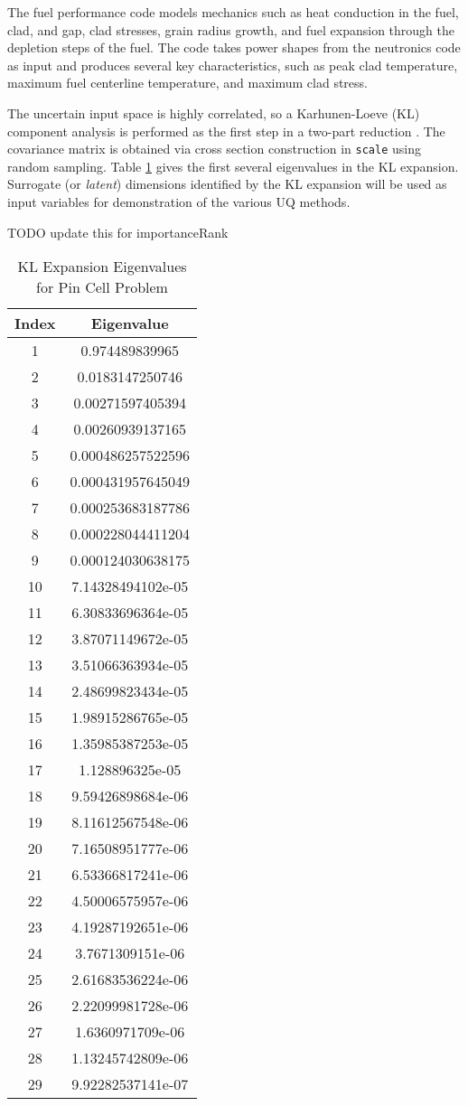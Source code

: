 The fuel performance code models mechanics such as heat conduction in the fuel, clad, and gap, clad stresses, grain radius
growth, and fuel expansion through the depletion steps of the fuel. The code takes power shapes
from the neutronics code as input and produces several key characteristics, such as peak clad temperature, maximum
fuel centerline temperature, and maximum clad stress.

The uncertain input space is highly correlated, so a Karhunen-Loeve (KL) component analysis is performed as
the first step in a two-part reduction \cite{physor2016}. The
covariance matrix is obtained via cross section construction in \texttt{scale}\cite{scale} using random sampling.  
Table \ref{tab:pcarank} gives the first several eigenvalues in the KL expansion.  Surrogate (or
\emph{latent}) dimensions identified by the KL expansion will be used as input variables for demonstration of
the various UQ methods.

TODO update this for importanceRank

\begin{table}[H]
  \centering
  \begin{tabular}{c|c}
Index & Eigenvalue \\ \hline
1 & 0.974489839965 \\
2 & 0.0183147250746 \\
3 & 0.00271597405394 \\
4 & 0.00260939137165 \\
5 & 0.000486257522596 \\
6 & 0.000431957645049 \\
7 & 0.000253683187786 \\
8 & 0.000228044411204 \\
9 & 0.000124030638175 \\
10 & 7.14328494102e-05 \\
11 & 6.30833696364e-05 \\
12 & 3.87071149672e-05 \\
13 & 3.51066363934e-05 \\
14 & 2.48699823434e-05 \\
15 & 1.98915286765e-05 \\
16 & 1.35985387253e-05 \\
17 & 1.128896325e-05 \\
18 & 9.59426898684e-06 \\
19 & 8.11612567548e-06 \\
20 & 7.16508951777e-06 \\
21 & 6.53366817241e-06 \\
22 & 4.50006575957e-06 \\
23 & 4.19287192651e-06 \\
24 & 3.7671309151e-06 \\
25 & 2.61683536224e-06 \\
26 & 2.22099981728e-06 \\
27 & 1.6360971709e-06 \\
28 & 1.13245742809e-06 \\
29 & 9.92282537141e-07
\end{tabular}
\caption{KL Expansion Eigenvalues for Pin Cell Problem}
\label{tab:pcarank}
\end{table}
